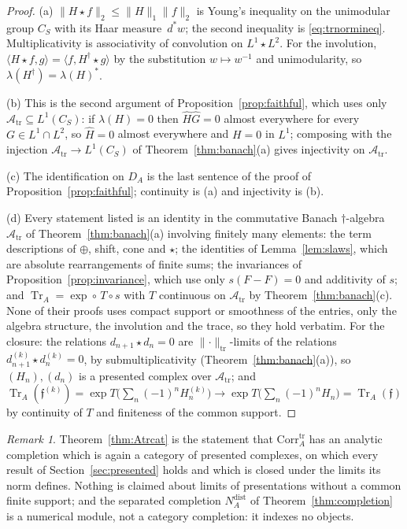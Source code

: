 \documentclass[11pt]{amsart}
\theoremstyle{definition}
\theoremstyle{remark}
\newtheorem{remark}[theorem]{Remark}
\newcommand{\dstar}{\,d^{*}}
\newcommand{\Tr}{\operatorname{Tr}}
\newcommand{\DA}{D_A}
\newcommand{\Atr}{\mathcal A_{\mathrm{tr}}}
\newcommand{\Corrtr}{\mathrm{Corr}^{\mathrm{tr}}_{A}}
\newcommand{\NAd}{N_A^{\mathrm{dist}}}
\begin{document}
\begin{proof}
(a)  $\lVert H\star f\rVert_{2}\le\lVert H\rVert_{1}\lVert f\rVert_{2}$ is
Young's inequality on the unimodular group $C_S$ with its Haar measure
$\dstar w$; the second inequality is \eqref{eq:trnormineq}.  Multiplicativity
is associativity of convolution on $L^{1}\star L^{2}$.  For the involution,
$\langle H\star f,g\rangle=\langle f,H^{\dagger}\star g\rangle$ by the
substitution $w\mapsto w^{-1}$ and unimodularity, so
$\lambda(H^{\dagger})=\lambda(H)^{*}$.

(b)  This is the second argument of Proposition~\ref{prop:faithful}, which uses
only $\Atr\subseteq L^{1}(C_S)$: if $\lambda(H)=0$ then $\widehat H\widehat
G=0$ almost everywhere for every $G\in L^{1}\cap L^{2}$, so $\widehat H=0$
almost everywhere and $H=0$ in $L^{1}$; composing with the injection
$\Atr\to L^{1}(C_S)$ of Theorem~\ref{thm:banach}(a) gives injectivity on
$\Atr$.

(c)  The identification on $\DA$ is the last sentence of the proof of
Proposition~\ref{prop:faithful}; continuity is (a) and injectivity is (b).

(d)  Every statement listed is an identity in the commutative Banach
$\dagger$-algebra $\Atr$ of Theorem~\ref{thm:banach}(a) involving finitely many
elements: the term descriptions of $\oplus$, shift, cone and $\star$; the
identities of Lemma~\ref{lem:slaws}, which are absolute rearrangements of
finite sums; the invariances of Proposition~\ref{prop:invariance}, which use
only $s(F-F)=0$ and additivity of $s$; and $\Tr_A=\exp\circ\,T\circ s$ with $T$
continuous on $\Atr$ by Theorem~\ref{thm:banach}(c).  None of their proofs uses
compact support or smoothness of the entries, only the algebra structure, the
involution and the trace, so they hold verbatim.  For the closure: the
relations $d_{n+1}\star d_n=0$ are
$\lVert\cdot\rVert_{\mathrm{tr}}$-limits of the relations
$d^{(k)}_{n+1}\star d^{(k)}_n=0$, by submultiplicativity
(Theorem~\ref{thm:banach}(a)), so $(H_n),(d_n)$ is a presented complex over
$\Atr$; and
$\Tr_A(\mathfrak f^{(k)})=\exp T\bigl(\sum_n(-1)^{n}H^{(k)}_n\bigr)\to
\exp T\bigl(\sum_n(-1)^{n}H_n\bigr)=\Tr_A(\mathfrak f)$ by continuity of $T$
and finiteness of the common support.
\end{proof}

\begin{remark}\label{rem:whichcompletion}
Theorem~\ref{thm:Atrcat} is the statement that $\Corrtr$ has an analytic
completion which is again a category of presented complexes, on which every
result of Section~\ref{sec:presented} holds and which is closed under the
limits its norm defines.  Nothing is claimed about limits of presentations
without a common finite support; and the separated completion $\NAd$ of
Theorem~\ref{thm:completion} is a numerical module, not a category completion:
it indexes no objects.
\end{remark}
\end{document}
